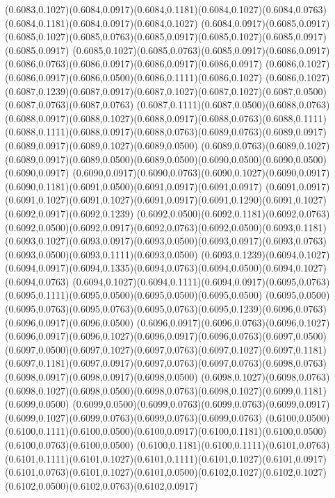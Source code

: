 (0.6083,0.1027)(0.6084,0.0917)(0.6084,0.1181)(0.6084,0.1027)(0.6084,0.0763)(0.6084,0.1181)(0.6084,0.0917)(0.6084,0.1027)
(0.6084,0.0917)(0.6085,0.0917)(0.6085,0.1027)(0.6085,0.0763)(0.6085,0.0917)(0.6085,0.1027)(0.6085,0.0917)(0.6085,0.0917)
(0.6085,0.1027)(0.6085,0.0763)(0.6085,0.0917)(0.6086,0.0917)(0.6086,0.0763)(0.6086,0.0917)(0.6086,0.0917)(0.6086,0.0917)
(0.6086,0.1027)(0.6086,0.0917)(0.6086,0.0500)(0.6086,0.1111)(0.6086,0.1027)
\PST@Solid(0.6086,0.1027)(0.6087,0.1239)(0.6087,0.0917)(0.6087,0.1027)(0.6087,0.1027)(0.6087,0.0500)(0.6087,0.0763)(0.6087,0.0763)
(0.6087,0.1111)(0.6087,0.0500)(0.6088,0.0763)(0.6088,0.0917)(0.6088,0.1027)(0.6088,0.0917)(0.6088,0.0763)(0.6088,0.1111)
(0.6088,0.1111)(0.6088,0.0917)(0.6088,0.0763)(0.6089,0.0763)(0.6089,0.0917)(0.6089,0.0917)(0.6089,0.1027)(0.6089,0.0500)
(0.6089,0.0763)(0.6089,0.1027)(0.6089,0.0917)(0.6089,0.0500)(0.6089,0.0500)(0.6090,0.0500)(0.6090,0.0500)(0.6090,0.0917)
(0.6090,0.0917)(0.6090,0.0763)(0.6090,0.1027)(0.6090,0.0917)(0.6090,0.1181)(0.6091,0.0500)(0.6091,0.0917)(0.6091,0.0917)
(0.6091,0.0917)(0.6091,0.1027)(0.6091,0.1027)(0.6091,0.0917)(0.6091,0.1290)(0.6091,0.1027)(0.6092,0.0917)(0.6092,0.1239)
(0.6092,0.0500)(0.6092,0.1181)(0.6092,0.0763)(0.6092,0.0500)(0.6092,0.0917)(0.6092,0.0763)(0.6092,0.0500)(0.6093,0.1181)
(0.6093,0.1027)(0.6093,0.0917)(0.6093,0.0500)(0.6093,0.0917)(0.6093,0.0763)(0.6093,0.0500)(0.6093,0.1111)(0.6093,0.0500)
(0.6093,0.1239)(0.6094,0.1027)(0.6094,0.0917)(0.6094,0.1335)(0.6094,0.0763)(0.6094,0.0500)(0.6094,0.1027)(0.6094,0.0763)
(0.6094,0.1027)(0.6094,0.1111)(0.6094,0.0917)(0.6095,0.0763)(0.6095,0.1111)(0.6095,0.0500)(0.6095,0.0500)(0.6095,0.0500)
(0.6095,0.0500)(0.6095,0.0763)(0.6095,0.0763)(0.6095,0.0763)(0.6095,0.1239)(0.6096,0.0763)(0.6096,0.0917)(0.6096,0.0500)
(0.6096,0.0917)(0.6096,0.0763)(0.6096,0.1027)(0.6096,0.0917)(0.6096,0.1027)(0.6096,0.0917)(0.6096,0.0763)(0.6097,0.0500)
(0.6097,0.0500)(0.6097,0.1027)(0.6097,0.0763)(0.6097,0.1027)(0.6097,0.1181)
\PST@Solid(0.6097,0.1181)(0.6097,0.0917)(0.6097,0.0763)(0.6097,0.0763)(0.6098,0.0763)(0.6098,0.0917)(0.6098,0.0917)(0.6098,0.0500)
(0.6098,0.1027)(0.6098,0.0763)(0.6098,0.1027)(0.6098,0.0500)(0.6098,0.0763)(0.6098,0.1027)(0.6099,0.1181)(0.6099,0.0500)
(0.6099,0.0500)(0.6099,0.0763)(0.6099,0.0763)(0.6099,0.0917)(0.6099,0.1027)(0.6099,0.0763)(0.6099,0.0763)(0.6099,0.0763)
(0.6100,0.0500)(0.6100,0.1111)(0.6100,0.0500)(0.6100,0.0917)(0.6100,0.1181)(0.6100,0.0500)(0.6100,0.0763)(0.6100,0.0500)
(0.6100,0.1181)(0.6100,0.1111)(0.6101,0.0763)(0.6101,0.1111)(0.6101,0.1027)(0.6101,0.1111)(0.6101,0.1027)(0.6101,0.0917)
(0.6101,0.0763)(0.6101,0.1027)(0.6101,0.0500)(0.6102,0.1027)(0.6102,0.1027)(0.6102,0.0500)(0.6102,0.0763)(0.6102,0.0917)
